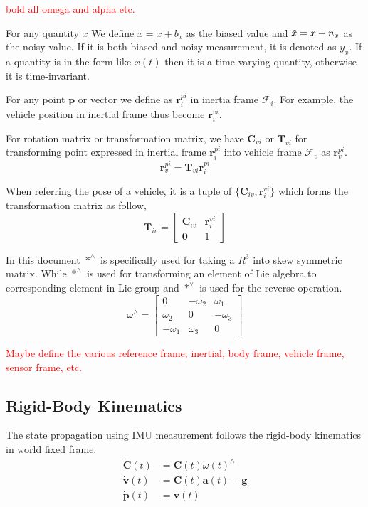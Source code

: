 \documentclass[conference]{IEEEtran}
\begin{document}
\textcolor{red}{bold all omega and alpha etc.}

For any quantity $x$ We define $\bar{x} = x + b_x$ as the biased value and $\Tilde{x} = x + n_x$ as the noisy value. If it is both biased and noisy measurement, it is denoted as $y_x$. If a quantity is in the form like $x(t)$ then it is a time-varying quantity, otherwise it is time-invariant.

For any point $\textbf{p}$ or vector we define as $\textbf{r}_i^{pi}$ in inertia frame $\mathcal{F}_i$. For example, the vehicle position in inertial frame thus become $\textbf{r}_i^{vi}$.

For rotation matrix or transformation matrix, we have $\textbf{C}_{vi}$ or $\textbf{T}_{vi}$ for transforming point expressed in inertial frame $\textbf{r}_i^{pi}$ into vehicle frame $\mathcal{F}_v$ as $\textbf{r}_v^{pi}$.
$$
\textbf{r}_v^{pi} = \textbf{T}_{vi} \textbf{r}_i^{pi}
$$

When referring the pose of a vehicle, it is a tuple of $\{\textbf{C}_{iv}, \textbf{r}_i^{vi}\}$ which forms the transformation matrix as follow,
$$
\textbf{T}_{iv} = \left[\begin{matrix}
    \textbf{C}_{iv} & \textbf{r}_i^{vi} \\
    \textbf{0} & 1
\end{matrix}\right]
$$

In this document $*^\wedge$ is specifically used for taking a $R^3$ into skew symmetric matrix. While $*^\wedge$ is used for transforming an element of Lie algebra to corresponding element in Lie group and $*^\vee$ is used for the reverse operation.
$$
\omega^\wedge = \left[\begin{matrix}
    0 & -\omega_2 & \omega_1 \\
    \omega_2 & 0 & -\omega_3 \\
    -\omega_1 & \omega_3 & 0
\end{matrix}\right]
$$

\textcolor{red}{Maybe define the various reference frame; inertial, body frame, vehicle frame, sensor frame, etc.}

\subsection{Rigid-Body Kinematics}

The state propagation using IMU measurement follows the rigid-body kinematics in world fixed frame.
$$
\begin{equation}
\begin{align}
    \dot{\textbf{C}}(t) &= \textbf{C}(t) \omega(t)^\wedge \\
    \dot{\textbf{v}}(t) &= \textbf{C}(t) \textbf{a}(t) - \textbf{g} \\
    \dot{\textbf{p}}(t) &= \textbf{v}(t)
\end{align}
\end{equation}
$$
\end{document}
